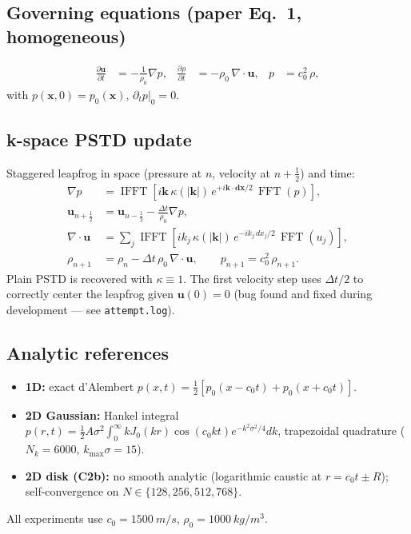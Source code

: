 \documentclass[11pt]{article}
\begin{document}
\subsection{Governing equations (paper Eq.\ 1, homogeneous)}
\begin{align}
\frac{\partial \mathbf{u}}{\partial t} &= -\frac{1}{\rho_0}\nabla p, &
\frac{\partial \rho}{\partial t} &= -\rho_0\,\nabla\!\cdot\!\mathbf{u}, &
p &= c_0^2\,\rho,
\end{align}
with $p(\mathbf{x},0)=p_0(\mathbf{x})$, $\partial_t p|_0 = 0$.

\subsection{k-space PSTD update}
Staggered leapfrog in space (pressure at $n$, velocity at $n+\tfrac12$) and time:
\begin{align}
\nabla p &= \operatorname{IFFT}\!\left[i\mathbf{k}\,\kappa(|\mathbf{k}|)\,
   e^{+i\mathbf{k}\cdot\mathbf{dx}/2}\,\operatorname{FFT}(p)\right],\\
\mathbf{u}_{n+\tfrac12} &= \mathbf{u}_{n-\tfrac12}
  -\tfrac{\Delta t}{\rho_0}\nabla p,\\
\nabla\!\cdot\!\mathbf{u} &= \sum_j
  \operatorname{IFFT}\!\left[i k_j\,\kappa(|\mathbf{k}|)\,
     e^{-i k_j\,dx_j/2}\,\operatorname{FFT}(u_j)\right],\\
\rho_{n+1} &= \rho_n -\Delta t\,\rho_0\,\nabla\!\cdot\!\mathbf{u},\qquad
p_{n+1} = c_0^2\,\rho_{n+1}.
\end{align}
Plain PSTD is recovered with $\kappa\equiv 1$. The first velocity step uses
$\Delta t/2$ to correctly center the leapfrog given $\mathbf{u}(0)=0$
(bug found and fixed during development --- see \texttt{attempt.log}).

\subsection{Analytic references}
\begin{itemize}
  \item \textbf{1D:} exact d'Alembert
    $p(x,t)=\tfrac12[p_0(x-c_0t)+p_0(x+c_0t)]$.
  \item \textbf{2D Gaussian:} Hankel integral
    $p(r,t)=\tfrac12 A\sigma^2\!\int_0^\infty\! k J_0(kr)\cos(c_0 kt)
       e^{-k^2\sigma^2/4}dk$,
    trapezoidal quadrature ($N_k=6000$, $k_{\max}\sigma=15$).
  \item \textbf{2D disk (C2b):} no smooth analytic (logarithmic caustic at
    $r=c_0t\pm R$); self-convergence on $N\in\{128,256,512,768\}$.
\end{itemize}
All experiments use $c_0=\SI{1500}{m/s}$, $\rho_0=\SI{1000}{kg/m^3}$.
\end{document}
